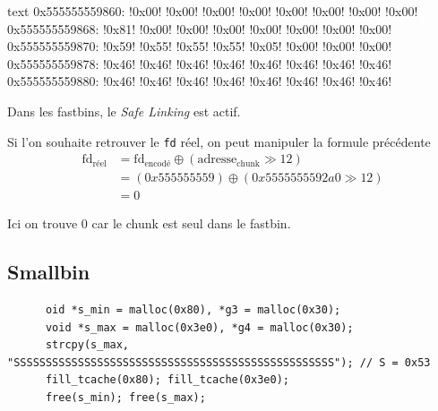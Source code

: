 \begin{pwndbg}[x/40bx f\_max - 0x10]{text}
    0x555555559860: !\textcolor{pwndbgbrown}{0x00}! !\textcolor{pwndbgbrown}{0x00}! !\textcolor{pwndbgbrown}{0x00}! !\textcolor{pwndbgbrown}{0x00}! !\textcolor{pwndbgbrown}{0x00}! !\textcolor{pwndbgbrown}{0x00}! !\textcolor{pwndbgbrown}{0x00}! !\textcolor{pwndbgbrown}{0x00}!
    0x555555559868: !\textcolor{pwndbgred}{0x81}! !\textcolor{pwndbgred}{0x00}! !\textcolor{pwndbgred}{0x00}! !\textcolor{pwndbgred}{0x00}! !\textcolor{pwndbgred}{0x00}! !\textcolor{pwndbgred}{0x00}! !\textcolor{pwndbgred}{0x00}! !\textcolor{pwndbgred}{0x00}!
    0x555555559870: !\textcolor{pwndbgblue}{0x59}! !\textcolor{pwndbgblue}{0x55}! !\textcolor{pwndbgblue}{0x55}! !\textcolor{pwndbgblue}{0x55}! !\textcolor{pwndbgblue}{0x05}! !\textcolor{pwndbgblue}{0x00}! !\textcolor{pwndbgblue}{0x00}! !\textcolor{pwndbgblue}{0x00}!
    0x555555559878: !\textcolor{pwndbgdarkgreen}{0x46}! !\textcolor{pwndbgdarkgreen}{0x46}! !\textcolor{pwndbgdarkgreen}{0x46}! !\textcolor{pwndbgdarkgreen}{0x46}! !\textcolor{pwndbgdarkgreen}{0x46}! !\textcolor{pwndbgdarkgreen}{0x46}! !\textcolor{pwndbgdarkgreen}{0x46}! !\textcolor{pwndbgdarkgreen}{0x46}!
    0x555555559880: !\textcolor{pwndbgdarkgreen}{0x46}! !\textcolor{pwndbgdarkgreen}{0x46}! !\textcolor{pwndbgdarkgreen}{0x46}! !\textcolor{pwndbgdarkgreen}{0x46}! !\textcolor{pwndbgdarkgreen}{0x46}! !\textcolor{pwndbgdarkgreen}{0x46}! !\textcolor{pwndbgdarkgreen}{0x46}! !\textcolor{pwndbgdarkgreen}{0x46}!
\end{pwndbg}

Dans les fastbins, le \textit{Safe Linking} est actif.

Si l'on souhaite retrouver le \texttt{fd} réel, on peut manipuler la formule précédente
$$
    \begin{aligned}
        \text{fd}_{\text{réel}} & = \text{fd}_{\text{encodé}} \oplus (\text{adresse}_{\text{chunk}} \gg 12) \\
                                & = (0x555555559) \oplus (0x5555555592a0 \gg 12)                            \\
                                & = 0
    \end{aligned}
$$

Ici on trouve 0 car le chunk est seul dans le fastbin.


\subsection{Smallbin}
\begin{verbatim}
      oid *s_min = malloc(0x80), *g3 = malloc(0x30);
      void *s_max = malloc(0x3e0), *g4 = malloc(0x30);
      strcpy(s_max, "SSSSSSSSSSSSSSSSSSSSSSSSSSSSSSSSSSSSSSSSSSSSSSSSSS"); // S = 0x53
      fill_tcache(0x80); fill_tcache(0x3e0);
      free(s_min); free(s_max);
\end{verbatim}


